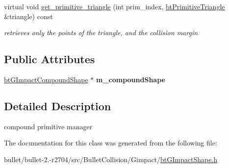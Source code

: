 \begin{DoxyCompactItemize}
\item 
\hypertarget{classbt_g_impact_compound_shape_1_1_compound_primitive_manager_acd5e9759ed51edee18f6c553ddaad6e2}{virtual void \hyperlink{classbt_g_impact_compound_shape_1_1_compound_primitive_manager_acd5e9759ed51edee18f6c553ddaad6e2}{get\+\_\+primitive\+\_\+triangle} (int prim\+\_\+index, \hyperlink{classbt_primitive_triangle}{bt\+Primitive\+Triangle} \&triangle) const }\label{classbt_g_impact_compound_shape_1_1_compound_primitive_manager_acd5e9759ed51edee18f6c553ddaad6e2}

\begin{DoxyCompactList}\small\item\em retrieves only the points of the triangle, and the collision margin \end{DoxyCompactList}\end{DoxyCompactItemize}
\subsection*{Public Attributes}
\begin{DoxyCompactItemize}
\item 
\hypertarget{classbt_g_impact_compound_shape_1_1_compound_primitive_manager_a8859a83b68d25f1a5d97b45e7a9ea6fd}{\hyperlink{classbt_g_impact_compound_shape}{bt\+G\+Impact\+Compound\+Shape} $\ast$ {\bfseries m\+\_\+compound\+Shape}}\label{classbt_g_impact_compound_shape_1_1_compound_primitive_manager_a8859a83b68d25f1a5d97b45e7a9ea6fd}

\end{DoxyCompactItemize}


\subsection{Detailed Description}
compound primitive manager 

The documentation for this class was generated from the following file\+:\begin{DoxyCompactItemize}
\item 
bullet/bullet-\/2.-\/r2704/src/\+Bullet\+Collision/\+Gimpact/\hyperlink{bt_g_impact_shape_8h}{bt\+G\+Impact\+Shape.\+h}\end{DoxyCompactItemize}
